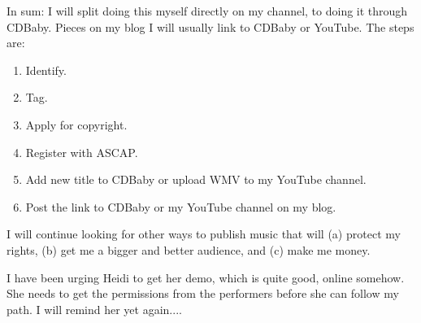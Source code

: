 \documentclass[english,11pt,letterpaper,onecolumn]{scrartcl}
\begin{document}
\noindent In sum: I will split doing this myself directly on my channel, to doing it through CDBaby. Pieces on my blog I will usually link to CDBaby or YouTube. The steps are:

\begin{enumerate}
\item Identify.
\item Tag.
\item Apply for copyright.
\item Register with ASCAP.
\item Add new title to CDBaby or upload WMV to my YouTube channel.
\item Post the link to CDBaby or my YouTube channel on my blog.
\end{enumerate}

I will continue looking for other ways to publish music that will (a) protect my rights, (b) get me a bigger and better audience, and (c) make me money.

I have been urging Heidi to get her demo, which is quite good, online somehow. She needs to get the permissions from the performers before she can follow my path. I will remind her yet again....
\end{document}
